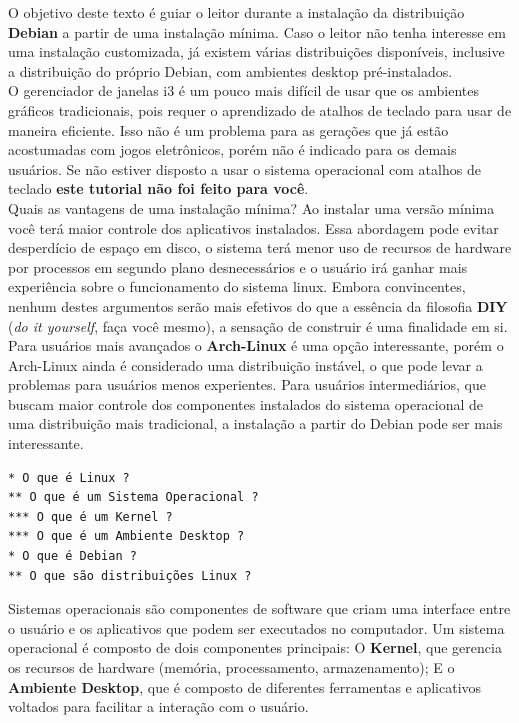 \documentclass[12pt,a4paper]{article}
\begin{document}
\hspace{\baselineskip}

O objetivo deste texto é guiar o leitor durante a instalação da distribuição \textbf{Debian} a partir de uma instalação mínima. Caso o leitor não tenha interesse em uma instalação customizada, já existem várias distribuições disponíveis, inclusive a distribuição do próprio Debian, com ambientes desktop pré-instalados. \\

O gerenciador de janelas i3 é um pouco mais difícil de usar que os ambientes gráficos tradicionais, pois requer o aprendizado de atalhos de teclado para usar de maneira eficiente. Isso não é um problema para as gerações que já estão acostumadas com jogos eletrônicos, porém não é indicado para os demais usuários. Se não estiver disposto a usar o sistema operacional com atalhos de teclado \textbf{este tutorial não foi feito para você}.\\

Quais as vantagens de uma instalação mínima? Ao instalar uma versão mínima você terá maior controle dos aplicativos instalados. Essa abordagem pode evitar desperdício de espaço em disco, o sistema terá menor uso de recursos de hardware por processos em segundo plano desnecessários e o usuário irá ganhar mais experiência sobre o funcionamento do sistema linux. Embora convincentes, nenhum destes argumentos serão mais efetivos do que a essência da filosofia \textbf{DIY} (\textit{do it yourself}, faça você mesmo), a sensação de construir é uma finalidade em si. \\

Para usuários mais avançados o \textbf{Arch-Linux} é uma opção interessante, porém o Arch-Linux ainda é considerado uma distribuição instável, o que pode levar a problemas para usuários menos experientes. Para usuários intermediários, que buscam maior controle dos componentes instalados do sistema operacional de uma distribuição mais tradicional, a instalação a partir do Debian pode ser mais interessante. \\

\begin{lstlisting}
* O que é Linux ?
** O que é um Sistema Operacional ? 
*** O que é um Kernel ?
*** O que é um Ambiente Desktop ?
* O que é Debian ?
** O que são distribuições Linux ? 
\end{lstlisting}

\vspace{\baselineskip}

Sistemas operacionais são componentes de software que criam uma interface entre o usuário e os aplicativos que podem ser executados no computador. Um sistema operacional é composto de dois componentes principais: O \textbf{Kernel}, que gerencia os recursos de hardware (memória, processamento, armazenamento); E o \textbf{Ambiente Desktop}, que é composto de diferentes ferramentas e aplicativos voltados para facilitar a interação com o usuário.\\
\end{document}
